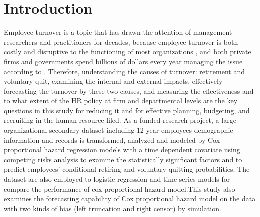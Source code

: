\documentclass[12pt,letterpaper]{article}
\title{}
\author{Xiaojuan Zhu}
\begin{document}
\maketitle

\begin{abstract}


\end{abstract}

\section{Introduction}
Employee turnover is a topic that has drawn the attention of management researchers and practitioners for decades, because  employee turnover is both costly and disruptive to the functioning of most organizations \citep{staw1980, mueller1989,kacmar2006}, and both private firms and governments spend billions of dollars every year managing the issue according to \citet{leonard2001}. Therefore, understanding the causes of turnover: retirement and voluntary quit, examining the internal and external impacts, effectively forecasting the turnover by these two causes, and measuring the effectiveness and to what extent of the HR policy at firm and departmental levels are the key questions in this study for reducing it and for effective planning, budgeting, and recruiting in the human resource filed. As a funded research project, a large organizational secondary dataset including 12-year employees demographic information and records is transformed, analyzed and modeled by Cox proportional hazard regression models with a time dependent covariate using competing risks analysis to examine the statistically significant factors and to predict employees' conditional retiring and voluntary quitting probabilities. The dataset are also employed to logistic regression and time series models for compare the performance of cox proportional hazard model.This study also examines the forecasting capability of Cox proportional hazard model on the data with two kinds of bias (left truncation and right censor) by simulation.
\end{document}
